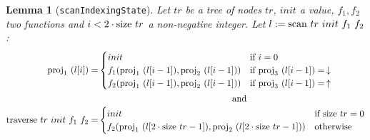 \documentclass{article}
\newtheorem{lemma}{Lemma}
\newcommand{\textfun}[1]{\textup{#1}}
\newcommand{\textcode}[1]{\texttt{#1}}
\newcommand{\longtraverse}[4]{\textfun{traverse}\ #1\ #2\ #3 \ #4}
\newcommand{\longscan}[4]{\textfun{scan}\ #1\ #2\ #3 \ #4}
\newcommand{\up}{\uparrow}
\newcommand{\down}{\downarrow}
\newcommand{\size}[1]{\textfun{size}\ #1}
\newcommand{\fst}[1]{\textfun{proj}_1\ #1}
\newcommand{\snd}[1]{\textfun{proj}_2\ #1}
\newcommand{\trd}[1]{\textfun{proj}_3\ #1}
\begin{document}
\begin{lemma}[\textcode{scanIndexingState}]
    \label{scan_indexing_state}
    Let $tr$ be a tree of nodes $tr$, $init$ a value, $f_1, f_2$ two functions and $i < 2 \cdot \size{tr}$ a non-negative integer. Let $l := \longscan{tr}{init}{f_1}{f_2}$:
    \begin{align}
    \fst{(l[i])} =& \begin{cases}
        init & \text{if $i = 0$}\\
        f_1(\fst{(l[i - 1])}, \snd{(l[i - 1])}) & \text{if $\trd{(l[i - 1])} = \, \down$} \\
        f_2(\fst{(l[i - 1])}, \snd{(l[i - 1])}) & \text{if $\trd{(l[i - 1])} = \, \up$}
    \end{cases}\\
    \intertext{\hskip 25em and}
    \longtraverse{tr}{init}{f_1}{f_2} =& 
        \begin{cases}
        init &\text{if $\size{tr} = 0$} \\
        f_2(\fst{(l[2 \cdot \size{tr} - 1])}, \snd{(l[2 \cdot \size{tr} - 1])}) &\text{otherwise}
        \end{cases}
    \end{align}
\end{lemma}
\end{document}
